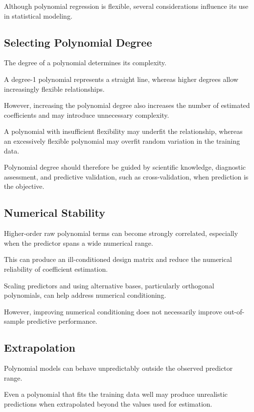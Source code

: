 \documentclass[
  letterpaper,
  DIV=11,
  numbers=noendperiod]{scrreprt}
\begin{document}
Although polynomial regression is flexible, several considerations
influence its use in statistical modeling.

\subsection{Selecting Polynomial
Degree}\label{selecting-polynomial-degree}

The degree of a polynomial determines its complexity.

A degree-1 polynomial represents a straight line, whereas higher degrees
allow increasingly flexible relationships.

However, increasing the polynomial degree also increases the number of
estimated coefficients and may introduce unnecessary complexity.

A polynomial with insufficient flexibility may underfit the
relationship, whereas an excessively flexible polynomial may overfit
random variation in the training data.

Polynomial degree should therefore be guided by scientific knowledge,
diagnostic assessment, and predictive validation, such as
cross-validation, when prediction is the objective.

\subsection{Numerical Stability}\label{numerical-stability}

Higher-order raw polynomial terms can become strongly correlated,
especially when the predictor spans a wide numerical range.

This can produce an ill-conditioned design matrix and reduce the
numerical reliability of coefficient estimation.

Scaling predictors and using alternative bases, particularly orthogonal
polynomials, can help address numerical conditioning.

However, improving numerical conditioning does not necessarily improve
out-of-sample predictive performance.

\subsection{Extrapolation}\label{extrapolation}

Polynomial models can behave unpredictably outside the observed
predictor range.

Even a polynomial that fits the training data well may produce
unrealistic predictions when extrapolated beyond the values used for
estimation.
\end{document}
